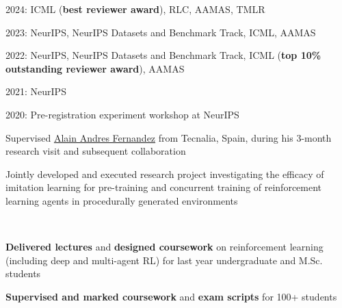\documentclass[]{lukas-cv-openfont}
\begin{document}


\noindent
\begin{tightitemize}{1.0em}
    \item 2024: ICML (\textbf{best reviewer award}), RLC, AAMAS, TMLR
    \item 2023: NeurIPS, NeurIPS Datasets and Benchmark Track, ICML, AAMAS
    \item 2022: NeurIPS, NeurIPS Datasets and Benchmark Track, ICML (\textbf{top 10\% outstanding reviewer award}), AAMAS
    \item 2021: NeurIPS
    \item 2020: Pre-registration experiment workshop at NeurIPS
\end{tightitemize}
\sectionsep



\begin{tightitemize}{1.7em}
    \item Supervised \href{https://aklein1995.github.io/}{Alain Andres Fernandez} from Tecnalia, Spain, during his 3-month research visit and subsequent collaboration
    \item Jointly developed and executed research project investigating the efficacy of imitation learning for pre-training and concurrent training of reinforcement learning agents in procedurally generated environments \cite{andres2023using}
\end{tightitemize}
\largesectionsep

\noindent
{}
\\
\begin{tightitemize}{1.7em}
    \item \textbf{Delivered lectures} and \textbf{designed coursework} on reinforcement learning (including deep and multi-agent RL) for last year undergraduate and M.Sc. students
    \item \textbf{Supervised and marked coursework} and \textbf{exam scripts} for 100+ students
\end{tightitemize}
\largesectionsep
\end{document}
